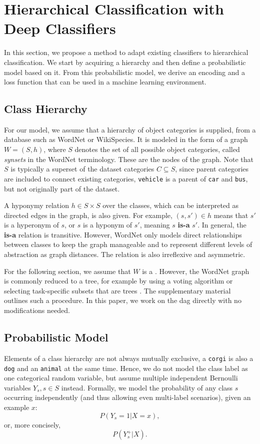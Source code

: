 \documentclass[10pt,twocolumn,letterpaper]{article}
\begin{document}
\section{Hierarchical Classification with Deep Classifiers}
In this section, we propose a method to adapt existing classifiers
to hierarchical classification. We start by acquiring a hierarchy and then define a probabilistic
model based on it. From this probabilistic model, we derive an encoding and a loss function
that can be used in a machine learning environment.

\subsection{Class Hierarchy}
For our model, we assume that a hierarchy of object categories is supplied,
\eg from a database such as WordNet\cite{Fellbaum1998WordNet} or WikiSpecies.
It is modeled in the form of a graph $W=(S,h)$, where $S$ denotes the set of all possible
object categories, called \emph{synsets} in the WordNet terminology.
These are the nodes of the graph. Note that $S$ is typically a superset of the dataset
categories $C \subseteq S$, since parent categories are included to connect existing categories,
\eg \texttt{vehicle} is a parent of \texttt{car} and \texttt{bus}, but not originally part
of the dataset.

A hyponymy relation $h \in S \times S$ over the classes, which can be
interpreted as directed edges in the graph, is also given. For example, $(s,s')\in h$ means that
$s'$ is a hyperonym of $s$, or $s$ is a hyponym of $s'$, meaning $s$ \textbf{is-a} $s'$.
In general, the \textbf{is-a} relation is transitive. However, WordNet only models direct
relationships between classes to keep the graph manageable and to represent different
levels of abstraction as graph distances. The relation is also irreflexive and
asymmetric. 

For the following section, we assume that $W$ is a . However,
the WordNet graph is commonly reduced to a tree, for example by using a voting algorithm \cite{Torralba2008Tiny}
or selecting task-specific subsets that are trees \cite{Deng2009ImageNet}. The supplementary material
outlines such a procedure. In this paper, we work on the \gls{dag} directly with no modifications needed.

\subsection{Probabilistic Model}
Elements of a class hierarchy are not always mutually exclusive, \eg a \texttt{corgi} is also a \texttt{dog} and an \texttt{animal} at the same time.
Hence, we do not model the class label as one categorical random variable, but
assume multiple independent Bernoulli variables $Y_{s}, s \in S$ instead. 
Formally, we model the probability of any class $s$ occurring independently (and thus allowing even multi-label
scenarios), given an example $x$:
\begin{equation}
P(Y_{s}=1 | X=x),
\end{equation}
or, more concisely,
\begin{equation}
P(Y_s^+ | X).
\label{eqn:themodel}
\end{equation}
\end{document}
